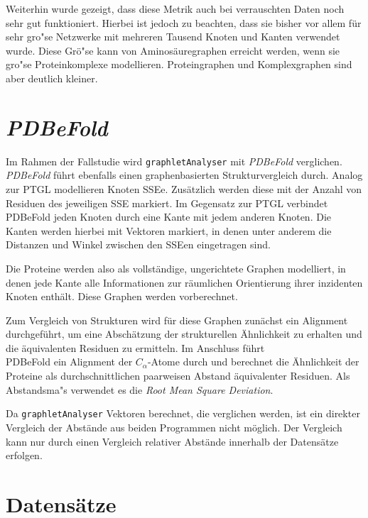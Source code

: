 \documentclass{report}
\begin{document}
Weiterhin wurde gezeigt, \cite{frqdistribution} dass diese Metrik auch bei verrauschten Daten noch sehr gut funktioniert. Hierbei ist jedoch zu beachten, dass sie bisher vor allem f\"ur sehr gro"se Netzwerke mit mehreren Tausend Knoten und Kanten verwendet wurde. Diese Gr\"o"se kann von Aminos\"auregraphen erreicht werden, wenn sie gro"se Proteinkomplexe modellieren. Proteingraphen und Komplexgraphen sind aber deutlich kleiner.

\section{\textit{PDBeFold}}

Im Rahmen der Fallstudie wird \texttt{graphletAnalyser} mit \textit{PDBeFold} \cite{pdbefold} verglichen. \textit{PDBeFold} f\"uhrt ebenfalls einen graphenbasierten Strukturvergleich durch. Analog zur PTGL modellieren Knoten SSEe. Zus\"atzlich werden diese mit der Anzahl von Residuen des jeweiligen SSE markiert. Im Gegensatz zur PTGL verbindet PDBeFold jeden Knoten durch eine Kante mit jedem anderen Knoten. Die Kanten werden hierbei mit Vektoren markiert, in denen unter anderem die Distanzen und Winkel zwischen den SSEen eingetragen sind.

Die Proteine werden also als vollst\"andige, ungerichtete Graphen modelliert, in denen jede Kante alle Informationen zur r\"aumlichen Orientierung ihrer inzidenten Knoten enth\"alt. Diese Graphen werden vorberechnet.

Zum Vergleich von Strukturen wird f\"ur diese Graphen zun\"achst ein Alignment durchgef\"uhrt, um eine Absch\"atzung der strukturellen \"Ahnlichkeit zu erhalten und die \"aquivalenten Residuen zu ermitteln. Im Anschluss f\"uhrt \\ PDBeFold ein Alignment der $C_{\alpha}$-Atome durch und berechnet die \"Ahnlichkeit der Proteine als durchschnittlichen paarweisen Abstand \"aquivalenter Residuen. Als Abstandsma"s verwendet es die \textit{Root Mean Square Deviation}.

Da \texttt{graphletAnalyser} Vektoren berechnet, die verglichen werden, ist ein direkter Vergleich der Abst\"ande aus beiden Programmen nicht m\"oglich. Der Vergleich kann nur durch einen Vergleich relativer Abst\"ande innerhalb der Datens\"atze erfolgen.


\section{Datens\"atze}
\end{document}
